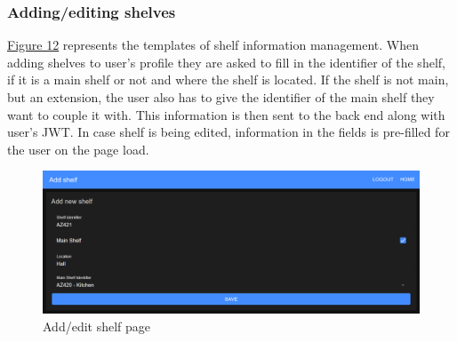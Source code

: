 \documentclass{article}
\begin{document}
\subsubsection{Adding/editing shelves}
\hyperref[fig:add-shelf]{Figure 12} represents the templates of shelf information management. When adding shelves to user's profile they are asked to fill in the identifier of the shelf, if it is a main shelf or not and where the shelf is located. If the shelf is not main, but an extension, the user also has to give the identifier of the main shelf they want to couple it with. This information is then sent to the back end along with user's JWT. In case shelf is being edited, information in the fields is pre-filled for the user on the page load.

\begin{figure}[H]
    \begin{center}
        \includegraphics[width=1\textwidth]{Front-End/Shelf.png}
    \end{center}
    \caption{Add/edit shelf page}
    \label{fig:add-shelf}
\end{figure}
\end{document}
